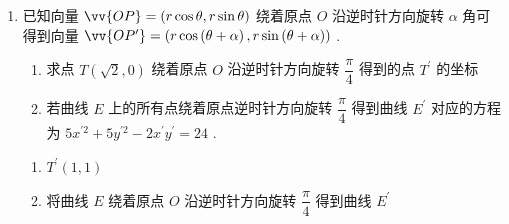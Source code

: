 \begin{enumerate}
\begin{jieda}
\begin{enumerate}
            因此$C: \dfrac{x^2}{4} - \dfrac{y^2}{4} = 1$

            \item 圆心 $M\left( {2,0}\right)$ 到直线 $l$ 的距离 ${d}_{1} = \dfrac{\left| 6 + 0 - 3\right| }{\sqrt{9 + {16}}} = \dfrac{3}{5}$ ，则 $\left| {AB}\right|  = 2\sqrt{1 - {\left( \dfrac{3}{5}\right) }^{2}} = \dfrac{8}{5}$ .

            \item $S_{\triangle HAB} = \dfrac{1}{2} |AB| \times d$，其中$d$为$H$到$l$的距离.

            设$H(-4+2cos\theta, 2sin\theta)$， 则$d = \dfrac{|3(-4+2cos\theta) + 4(2sin\theta) - 3|}{\sqrt{9+16}} = \dfrac{|6cos\theta + 8sin\theta -15|}{5} = \dfrac{|10sin(\theta+\varphi)-15|}{5} \in [1, 5]$，因此$S_{\triangle HAB} \in \left[\dfrac{4}{5}, 4\right]$
        \end{enumerate}
    \end{jieda}
    \clearpage
    \item 已知向量 $\vv{OP} = \left( {r\cos \theta ,r\sin \theta }\right)$ 绕着原点 $O$ 沿逆时针方向旋转 $\alpha$ 角可得到向量 $\vv{O{P}^{\prime }} = \left( {r\cos \left( {\theta  + \alpha }\right) ,r\sin \left( {\theta  + \alpha }\right) }\right)$ .
    \begin{enumerate}
        \item 求点 $T\left( {\sqrt{2},0}\right)$ 绕着原点 $O$ 沿逆时针方向旋转 $\dfrac{\pi }{4}$ 得到的点 ${T}^{\prime }$ 的坐标
        \item 若曲线 $E$ 上的所有点绕着原点逆时针方向旋转 $\dfrac{\pi }{4}$ 得到曲线 ${E}^{\prime }$ 对应的方程为 $5{x}^{\prime 2} + 5{y}^{\prime 2} - 2{x}^{\prime }{y}^{\prime } = {24}$ .
    \end{enumerate}

    \begin{jieda}
        \begin{enumerate}
            \item ${T}^{\prime }\left( {1,1}\right)$
            \item 将曲线 $E$ 绕着原点 $O$ 沿逆时针方向旋转 $\dfrac{\pi }{4}$ 得到曲线 ${E}^{\prime }$
            

\end{enumerate}
\end{jieda}
\end{enumerate}

